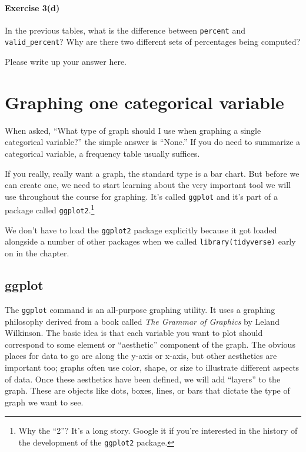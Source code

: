 \documentclass[
]{book}
\begin{document}
\hypertarget{exercise-3d}{%
\paragraph*{Exercise 3(d)}\label{exercise-3d}}

In the previous tables, what is the difference between \texttt{percent} and \texttt{valid\_percent}? Why are there two different sets of percentages being computed?

Please write up your answer here.

\hypertarget{categorical-graphing-one}{%
\section{Graphing one categorical variable}\label{categorical-graphing-one}}

When asked, ``What type of graph should I use when graphing a single categorical variable?'' the simple answer is ``None.'' If you do need to summarize a categorical variable, a frequency table usually suffices.

If you really, really want a graph, the standard type is a bar chart. But before we can create one, we need to start learning about the very important tool we will use throughout the course for graphing. It's called \texttt{ggplot} and it's part of a package called \texttt{ggplot2}.\footnote{Why the ``2''? It's a long story. Google it if you're interested in the history of the development of the \texttt{ggplot2} package.}

We don't have to load the \texttt{ggplot2} package explicitly because it got loaded alongside a number of other packages when we called \texttt{library(tidyverse)} early on in the chapter.

\hypertarget{categorical-ggplot}{%
\subsection{ggplot}\label{categorical-ggplot}}

The \texttt{ggplot} command is an all-purpose graphing utility. It uses a graphing philosophy derived from a book called \emph{The Grammar of Graphics} by Leland Wilkinson. The basic idea is that each variable you want to plot should correspond to some element or ``aesthetic'' component of the graph. The obvious places for data to go are along the y-axis or x-axis, but other aesthetics are important too; graphs often use color, shape, or size to illustrate different aspects of data. Once these aesthetics have been defined, we will add ``layers'' to the graph. These are objects like dots, boxes, lines, or bars that dictate the type of graph we want to see.
\end{document}
